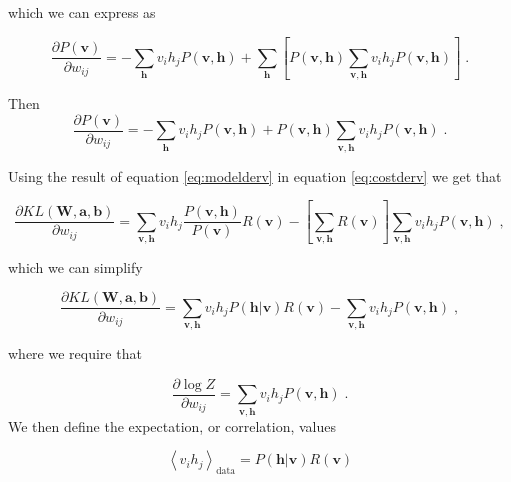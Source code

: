 which we can express as

\begin{equation}
    \frac{\partial P(\boldsymbol{v})}{\partial w_{ij}} = - \sum_{\boldsymbol{h}} v_i h_j P(\boldsymbol{v},\boldsymbol{h}) + \sum_{\boldsymbol{h}} \left [ P(\boldsymbol{v},\boldsymbol{h}) \sum_{\boldsymbol{v},\boldsymbol{h}} v_i h_j P(\boldsymbol{v},\boldsymbol{h})  \right ] \; .
\end{equation}

Then
\begin{equation} \label{eq:modelderv}
     \frac{\partial P(\boldsymbol{v})}{\partial w_{ij}} = - \sum_{\boldsymbol{h}} v_i h_j P(\boldsymbol{v},\boldsymbol{h}) + P(\boldsymbol{v},\boldsymbol{h}) \sum_{\boldsymbol{v},\boldsymbol{h}} v_i h_j P(\boldsymbol{v},\boldsymbol{h}) \; .
\end{equation}

Using the result of equation \ref{eq:modelderv} in equation \ref{eq:costderv} we get that

\begin{equation}
    \frac{ \partial KL(\boldsymbol{W}, \boldsymbol{a}, \boldsymbol{b})}{\partial w_{ij}} = \sum_{\boldsymbol{v},\boldsymbol{h}} v_i h_j \frac{P(\boldsymbol{v},\boldsymbol{h})}{P(\boldsymbol{v})} R(\boldsymbol{v}) - \left [\sum_{\boldsymbol{v},\boldsymbol{h}} R(\boldsymbol{v})\right ] \sum_{\boldsymbol{v},\boldsymbol{h}} v_i h_j P(\boldsymbol{v},\boldsymbol{h}) \; ,
\end{equation}

which we can simplify

\begin{equation}
    \frac{ \partial KL(\boldsymbol{W}, \boldsymbol{a}, \boldsymbol{b})}{\partial w_{ij}} = \sum_{\boldsymbol{v},\boldsymbol{h}} v_i h_j P(\boldsymbol{h} | \boldsymbol{v}) R(\boldsymbol{v}) - \sum_{\boldsymbol{v},\boldsymbol{h}} v_i h_j P(\boldsymbol{v},\boldsymbol{h}) \; ,
\end{equation}

where we require that

\begin{equation}
     \frac{\partial \log{Z} }{\partial w_{ij}} = \sum_{\boldsymbol{v},\boldsymbol{h}} v_i h_j P(\boldsymbol{v},\boldsymbol{h}) \; .
\end{equation}
We then define the expectation, or correlation, values

\begin{equation}
    \left < v_i h_j \right >_{\text{data}} = P(\boldsymbol{h} | \boldsymbol{v}) R(\boldsymbol{v})
\end{equation}

